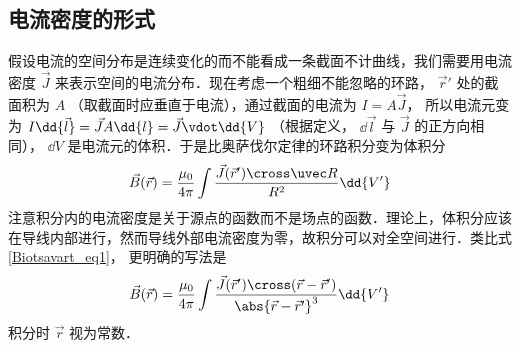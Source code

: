 \subsection{电流密度的形式}
假设电流的空间分布是连续变化的而不能看成一条截面不计曲线，我们需要用电流密度 $\vec J$ 来表示空间的电流分布．现在考虑一个粗细不能忽略的环路， $\vec r'$ 处的截面积为 $A$ （取截面时应垂直于电流），通过截面的电流为 $I = A\vec J$， 所以电流元变为 $I \dd{\vec l} = \vec JA \dd{l} = \vec J \vdot \dd{V}$ （根据定义， $\dd{\vec l}$ 与 $\vec J$ 的正方向相同）， $\dd{V}$ 是电流元的体积．于是比奥萨伐尔定律的环路积分变为体积分
\begin{equation}
\vec B(\vec r) = \frac{\mu_0}{4\pi} \int \frac{\vec J(\vec r') \cross \uvec R}{R^2}\dd{V'}
\end{equation}
注意积分内的电流密度是关于源点的函数而不是场点的函数．理论上，体积分应该在导线内部进行，然而导线外部电流密度为零，故积分可以对全空间进行．类比式\autoref{Biotsavart_eq1}， 更明确的写法是
\begin{equation}
\vec B(\vec r) = \frac{\mu_0}{4\pi} \int \frac{\vec J(\vec r') \cross (\vec r - \vec r')}{\abs{\vec r - \vec r'}^3} \dd{V'}
\end{equation}
积分时 $\vec r$ 视为常数．

